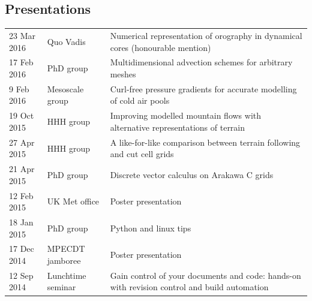 \documentclass[a4paper,11pt]{article}
\begin{document}
\subsection*{Presentations}
\begin{tabularx}{\linewidth}{l l X}
23 Mar 2016 & Quo Vadis & Numerical representation of orography in dynamical cores (honourable mention) \\
17 Feb 2016 & PhD group & Multidimensional advection schemes for arbitrary meshes \\
9 Feb 2016 & Mesoscale group & Curl-free pressure gradients for accurate modelling of cold air pools \\
19 Oct 2015 & HHH group & Improving modelled mountain flows with alternative representations of terrain \\
27 Apr 2015 & HHH group & A like-for-like comparison between terrain following and cut cell grids \\
21 Apr 2015 & PhD group & Discrete vector calculus on Arakawa C grids \\
12 Feb 2015 & UK Met office & Poster presentation \\
18 Jan 2015 & PhD group & Python and linux tips \\
17 Dec 2014 & MPECDT jamboree & Poster presentation \\
12 Sep 2014 & Lunchtime seminar  & Gain control of your documents and code: hands-on with revision control and build automation \\
\end{tabularx}
\end{document}
